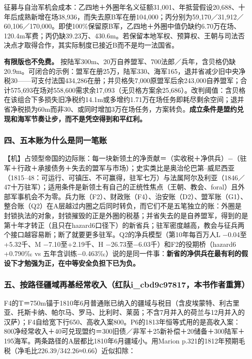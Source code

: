 \documentclass[
  10pt,
  a4paper,
]{article}
\newcommand{\literalquote}{{\addfontfeatures{Mapping=}\char34}}
\begin{document}
征募与自治军机会成本：乙四地＋外圈年名义征额31,001、年抵营假设20,688、十年后成熟新增在场38,936，而失去原B军在册104,000；丙分别为59,170／31,912／60,106／170,000。即使100\%保留原B军，乙四地＋外圈中值仍缺约6.70万在场、120.4m军费；丙仍缺39.23万、430.6m。\literalquote{}若保留本地军权、预算权、王朝与司法否决点才取得合作，其实际制度已接近B而不是均一法国省。\literalquote{}

\textbf{有限版也不免费。}
按陆军300m、20万自养盟军、700法郎／兵年，含贝格仍缺20.9m。可闭合的示例：盟军在册25万，陆军330、海军165，退并省减少旧中央净税30------可支付法国434,286在册；并贝格失7,000原盟军后余243,000自养盟军；合计575,693在场对558,600需求余17,093（无贝格方案余25,686）。改判阈值：含贝格在该组合下多损失旧净税约14.1m或多增约1.71万在场任务即耗尽剩余空间；退并省净税损为60m而非30、或同时增加3万在场任务，方案转负。\textbf{成立条件是盟约兑现和海军节奏让步，而不是凭空得到和平红利。}

\subsubsection{四、五本账为什么是同一笔账}\label{ux56dbux4e94ux672cux8d26ux4e3aux4ec0ux4e48ux662fux540cux4e00ux7b14ux8d26}

【机】占领型帝国的边际账：每一块新领土的净贡献＝（实收税＋净供兵）−（驻军＋行政＋承接债务＋失去的盟军与市场）；史实类比是奥治伦巴第--威尼西亚（1815--48：可运行、可镇压、不可赢得，驻军七万）与法属阿尔及利亚（1846／47十万驻军）；适用条件是新领土有自己的正统性焦点（王朝、教会、foral）且外部军事机会不为零。兵力账（F2）、财政账（F4）、治安账（D2）、盟军账（G1）、整合账（Q2）在A层越过内圈之后同时转负，而它们不是五笔独立的账：外圈是封锁执法的对象，封锁摧毁的正是外圈的税基；并省失去的是自养盟军，得到的是第十年才转正（且只在hazard6口径下）的新省兵；驻军密度越高，教会与征兵两个接口越容易断；断了就要更多驻军。Q2的净兵模型（第10年每百万人L
−0.04至+5.32千、M −7.10至+2.19千、H
−26.73至−6.03千）和F2的役期桥（hazard6 +0.790‰ vs
五年含训练−0.463‰）说的是同一件事：\textbf{新省的净供兵在最有利的假设下才勉强为正，在中等安全负担下已为负。}

\subsubsection{五、按路径疆域再基经常收入（红队i\_cbd9c97817，本书作者重算）}\label{ux4e94ux6309ux8defux5f84ux7586ux57dfux518dux57faux7ecfux5e38ux6536ux5165ux7ea2ux961fi_cbd9c97817ux672cux4e66ux4f5cux8005ux91cdux7b97}

F4的T＝750m锚于1810年6月普通账已纳入的疆域与税目（含皮埃蒙特、利古里亚、托斯卡纳、帕尔马、罗马、比利时、莱茵；不含7月并入的荷兰与12月并入的汉萨）；F4自给宽下行650、高收入案800。P6的1813年恒等式用的是高收入案：800净经常收入＋40可兑现盟约＝300旧债／非军＋25新补偿＋20储备＋300陆军＋195海军。两条路径的A层都比1810年6月疆域小。用Marion
p.321的1812年预期毛税（净毛比226.39/342.26≈0.66）近似扣除：
\end{document}
